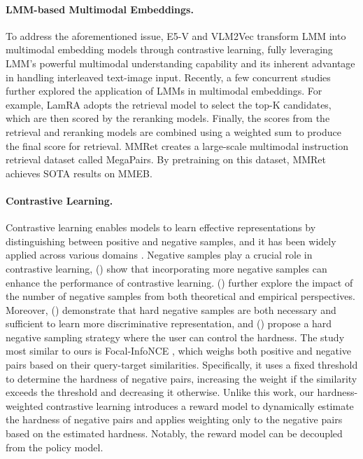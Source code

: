 \documentclass[11pt]{article}
\begin{document}
\paragraph{LMM-based Multimodal Embeddings.}
To address the aforementioned issue, E5-V \cite{E5-V} and VLM2Vec \cite{VLM2Vec} transform LMM into multimodal embedding models through contrastive learning, fully leveraging LMM's powerful multimodal understanding capability and its inherent advantage in handling interleaved text-image input. Recently, a few concurrent studies \cite{DBLP:conf/cvpr/ZhangZXLDLXZLZ25,DBLP:journals/corr/abs-2504-17432,DBLP:journals/corr/abs-2505-11293} further explored the application of LMMs in multimodal embeddings. For example, LamRA \cite{LamRA} adopts the retrieval model to select the top-K candidates, which are then scored by the reranking models. Finally, the scores from the retrieval and reranking models are combined using a weighted sum to produce the final score for retrieval. MMRet \cite{MMRet} creates a large-scale multimodal instruction retrieval dataset called MegaPairs. By pretraining on this dataset, MMRet achieves SOTA results on MMEB. 

\paragraph{Contrastive Learning.} Contrastive learning enables models to learn effective representations by distinguishing between positive and negative samples, and it has been widely applied across various domains \cite{DBLP:conf/iclr/KipfPW20,DBLP:conf/sigir/WuWF0CLX21,DBLP:journals/jair/LanLSXLWL23,DBLP:journals/ai/YinZSZMZHL23,DBLP:conf/emnlp/ZhangYFLSLMZWS24}.
Negative samples play a crucial role in contrastive learning, \citeauthor{DBLP:conf/icml/ChenK0H20} (\citeyear{DBLP:conf/icml/ChenK0H20}) show that incorporating more negative samples can enhance the performance of contrastive learning. \citeauthor{DBLP:conf/icml/AwasthiDK22} (\citeyear{DBLP:conf/icml/AwasthiDK22}) further explore the impact of the number of negative samples from both theoretical and empirical perspectives. Moreover, \citeauthor{DBLP:journals/corr/abs-2010-06682} (\citeyear{DBLP:journals/corr/abs-2010-06682}) demonstrate that hard negative samples are both necessary and sufficient to learn more discriminative representation, and \citeauthor{DBLP:conf/iclr/RobinsonCSJ21} (\citeyear{DBLP:conf/iclr/RobinsonCSJ21}) propose a hard negative sampling strategy where the user can control the hardness. The study most similar to ours is Focal-InfoNCE \cite{DBLP:conf/emnlp/HouL23}, which weighs both positive and negative pairs based on their query-target similarities. Specifically, it uses a fixed threshold to determine the hardness of negative pairs, increasing the weight if the similarity exceeds the threshold and decreasing it otherwise. Unlike this work, our hardness-weighted contrastive learning introduces a reward model to dynamically estimate the hardness of negative pairs and applies weighting only to the negative pairs based on the estimated hardness. Notably, the reward model can be decoupled from the policy model.
\end{document}
